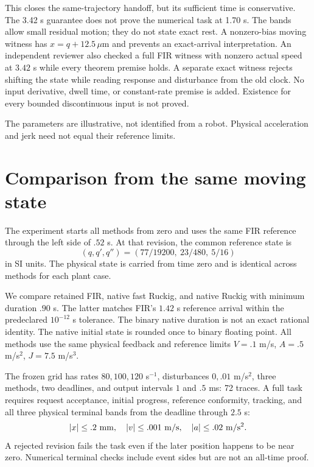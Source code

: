 \documentclass[10pt,letterpaper]{article}
\begin{document}
This closes the same-trajectory handoff, but its sufficient time is conservative.
The 3.42 s guarantee does not prove the numerical task at 1.70 s. The bands allow
small residual motion; they do not state exact rest. A nonzero-bias moving
witness has $x=q+12.5\,\mu$m and prevents an exact-arrival interpretation. An
independent reviewer also checked a full FIR witness with nonzero actual speed
at $3.42$ s while every theorem premise holds.
A separate exact witness rejects shifting the state while reading response and
disturbance from the old clock. No input derivative, dwell time, or constant-rate
premise is added. Existence for every bounded discontinuous input is not proved.

The parameters are illustrative, not identified from a robot. Physical
acceleration and jerk need not equal their reference limits.


\section{Comparison from the same moving state}
The experiment starts all methods from zero and uses the same FIR reference
through the left side of $.52$ s. At that revision, the common reference state is
\[
 (q,q',q'')=(77/19200,\ 23/480,\ 5/16)
\]
in SI units. The physical state is carried from time zero and is identical
across methods for each plant case.

We compare retained FIR, native fast Ruckig, and native Ruckig with minimum
duration $.90$ s. The latter matches FIR's $1.42$ s reference arrival within
the predeclared $10^{-12}$ s tolerance. The binary native duration is not an
exact rational identity. The native initial state is rounded once to binary
floating point. All methods use the same physical feedback and reference
limits $V=.1$ m/s, $A=.5$ m/s$^2$, $J=7.5$ m/s$^3$.

The frozen grid has rates $80,100,120$ s$^{-1}$, disturbances $0,.01$ m/s$^2$,
three methods, two deadlines, and output intervals $1$ and $.5$ ms:
72 traces. A full task requires request acceptance, initial progress,
reference conformity, tracking, and all three physical terminal bands from
the deadline through $2.5$ s:
\[
 |x|\leq.2\ {\rm mm},\quad |v|\leq.001\ {\rm m/s},\quad
 |a|\leq.02\ {\rm m/s^2}.
\]
A rejected revision fails the task even if the later position happens to be
near zero. Numerical terminal checks include event sides but are not an
all-time proof.
\end{document}
